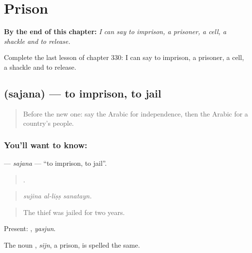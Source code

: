 
\chapter{Prison}
\label{ch:ar-prison}

\begin{chapteropening}
\textbf{By the end of this chapter:} \emph{I can say to imprison, a prisoner, a cell, a shackle and to release.}

Complete the last lesson of chapter 330: I can say to imprison, a prisoner, a cell, a shackle and to release.
\end{chapteropening}

\section[\texorpdfstring{\ar{سجن} (sajana)}{سجن (sajana)}]{ (sajana) — to imprison, to jail}

\label{lesson:AR-C330-sajana}



\begin{quote}
Before the new one: say the Arabic for independence, then the Arabic for a country’s people.
\end{quote}

\subsection*{You'll want to know: }
\textbf{} — \emph{sajana} — \textquotedblleft{}to imprison, to jail\textquotedblright{}.

\begin{quote}
  .
\end{quote}

\begin{quote}
\emph{sujina al-liṣṣ sanatayn.}
\end{quote}

\begin{quote}
The thief was jailed for two years.
\end{quote}

Present: , \emph{yasjun}.

The noun , \emph{sijn}, a prison, is spelled the same.

